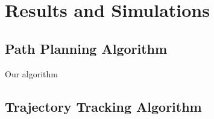 \documentclass[11pt, a4paper]{article}
\begin{document}







\section{Results and Simulations}
  \subsection{Path Planning Algorithm}
  Our algorithm 
  \subsection{Trajectory Tracking Algorithm}


\end{document}
